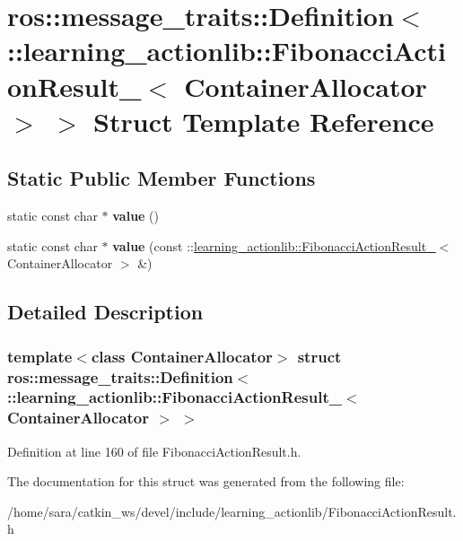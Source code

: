 \hypertarget{structros_1_1message__traits_1_1Definition_3_01_1_1learning__actionlib_1_1FibonacciActionResult_8c7a4fc01d877804b1af84da88c8cbec}{}\section{ros\+:\+:message\+\_\+traits\+:\+:Definition$<$ \+:\+:learning\+\_\+actionlib\+:\+:Fibonacci\+Action\+Result\+\_\+$<$ Container\+Allocator $>$ $>$ Struct Template Reference}
\label{structros_1_1message__traits_1_1Definition_3_01_1_1learning__actionlib_1_1FibonacciActionResult_8c7a4fc01d877804b1af84da88c8cbec}
\subsection*{Static Public Member Functions}
\begin{DoxyCompactItemize}
\item 
\mbox{\label{structros_1_1message__traits_1_1Definition_3_01_1_1learning__actionlib_1_1FibonacciActionResult_8c7a4fc01d877804b1af84da88c8cbec_aa9741414ce6c5ea7fd16a512d5b5cb29}} 
static const char $\ast$ {\bfseries value} ()
\item 
\mbox{\label{structros_1_1message__traits_1_1Definition_3_01_1_1learning__actionlib_1_1FibonacciActionResult_8c7a4fc01d877804b1af84da88c8cbec_ad8213e3dac59abfc1838e4ce45865130}} 
static const char $\ast$ {\bfseries value} (const \+::\hyperlink{structlearning__actionlib_1_1FibonacciActionResult__}{learning\+\_\+actionlib\+::\+Fibonacci\+Action\+Result\+\_\+}$<$ Container\+Allocator $>$ \&)
\end{DoxyCompactItemize}


\subsection{Detailed Description}
\subsubsection*{template$<$class Container\+Allocator$>$\newline
struct ros\+::message\+\_\+traits\+::\+Definition$<$ \+::learning\+\_\+actionlib\+::\+Fibonacci\+Action\+Result\+\_\+$<$ Container\+Allocator $>$ $>$}



Definition at line 160 of file Fibonacci\+Action\+Result.\+h.



The documentation for this struct was generated from the following file\+:\begin{DoxyCompactItemize}
\item 
/home/sara/catkin\+\_\+ws/devel/include/learning\+\_\+actionlib/Fibonacci\+Action\+Result.\+h\end{DoxyCompactItemize}
